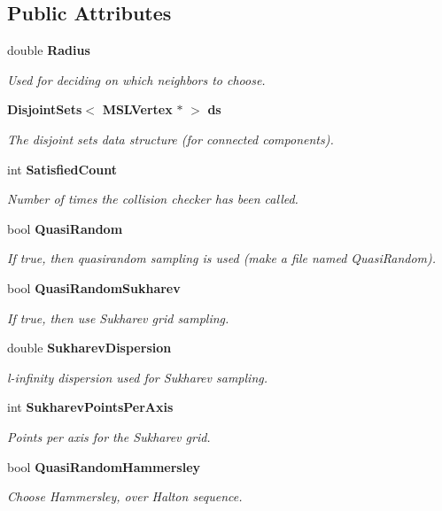 \subsection*{Public Attributes}
\begin{CompactItemize}
\item 
double {\bf Radius}
\begin{CompactList}\small\item\em Used for deciding on which neighbors to choose.\item\end{CompactList}\item 
{\bf Disjoint\-Sets}$<$ {\bf MSLVertex} $\ast$ $>$ {\bf ds}
\begin{CompactList}\small\item\em The disjoint sets data structure (for connected components).\item\end{CompactList}\item 
int {\bf Satisfied\-Count}
\begin{CompactList}\small\item\em Number of times the collision checker has been called.\item\end{CompactList}\item 
bool {\bf Quasi\-Random}
\begin{CompactList}\small\item\em If true, then quasirandom sampling is used (make a file named Quasi\-Random).\item\end{CompactList}\item 
bool {\bf Quasi\-Random\-Sukharev}
\begin{CompactList}\small\item\em If true, then use Sukharev grid sampling.\item\end{CompactList}\item 
double {\bf Sukharev\-Dispersion}
\begin{CompactList}\small\item\em l-infinity dispersion used for Sukharev sampling.\item\end{CompactList}\item 
int {\bf Sukharev\-Points\-Per\-Axis}
\begin{CompactList}\small\item\em Points per axis for the Sukharev grid.\item\end{CompactList}\item 
bool {\bf Quasi\-Random\-Hammersley}
\begin{CompactList}\small\item\em Choose Hammersley, over Halton sequence.\item\end{CompactList}\end{CompactItemize}
